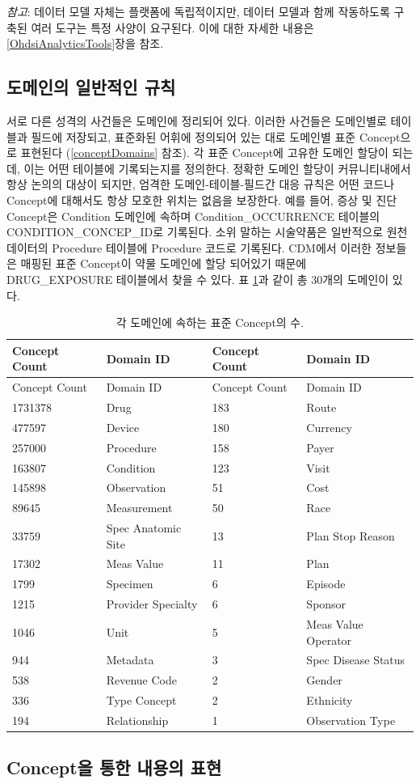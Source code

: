 \documentclass[11pt]{book}
\theoremstyle{definition}
\theoremstyle{definition}
\theoremstyle{definition}
\theoremstyle{remark}
\begin{document}
\emph{참고}: 데이터 모델 자체는 플랫폼에 독립적이지만, 데이터 모델과
함께 작동하도록 구축된 여러 도구는 특정 사양이 요구된다. 이에 대한
자세한 내용은 \ref{OhdsiAnalyticsTools}장을 참조.

\subsection{도메인의 일반적인 규칙}\label{domains}

서로 다른 성격의 사건들은 도메인에 정리되어 있다. 이러한 사건들은
도메인별로 테이블과 필드에 저장되고, 표준화된 어휘에 정의되어 있는 대로
도메인별 표준 Concept으로 표현된다 (\ref{conceptDomains} 참조). 각 표준
Concept에 고유한 도메인 할당이 되는데, 이는 어떤 테이블에 기록되는지를
정의한다. 정확한 도메인 할당이 커뮤니티내에서 항상 논의의 대상이 되지만,
엄격한 도메인-테이블-필드간 대응 규칙은 어떤 코드나 Concept에 대해서도
항상 모호한 위치는 없음을 보장한다. 예를 들어, 증상 및 진단 Concept은
Condition 도메인에 속하며 Condition\_OCCURRENCE
테이블의CONDITION\_CONCEP\_ID로 기록된다. 소위 말하는 시술약품은
일반적으로 원천 데이터의 Procedure 테이블에 Procedure 코드로 기록된다.
CDM에서 이러한 정보들은 매핑된 표준 Concept이 약물 도메인에 할당
되어있기 때문에 DRUG\_EXPOSURE 테이블에서 찾을 수 있다. 표
\ref{tab:domains}과 같이 총 30개의 도메인이 있다.

\begin{longtable}[]{@{}llll@{}}
\caption{\label{tab:domains} 각 도메인에 속하는 표준 Concept의
수.}\tabularnewline
\toprule
Concept Count & Domain ID & Concept Count & Domain ID\tabularnewline
\midrule
\endfirsthead
\toprule
Concept Count & Domain ID & Concept Count & Domain ID\tabularnewline
\midrule
\endhead
1731378 & Drug & 183 & Route\tabularnewline
477597 & Device & 180 & Currency\tabularnewline
257000 & Procedure & 158 & Payer\tabularnewline
163807 & Condition & 123 & Visit\tabularnewline
145898 & Observation & 51 & Cost\tabularnewline
89645 & Measurement & 50 & Race\tabularnewline
33759 & Spec Anatomic Site & 13 & Plan Stop Reason\tabularnewline
17302 & Meas Value & 11 & Plan\tabularnewline
1799 & Specimen & 6 & Episode\tabularnewline
1215 & Provider Specialty & 6 & Sponsor\tabularnewline
1046 & Unit & 5 & Meas Value Operator\tabularnewline
944 & Metadata & 3 & Spec Disease Status\tabularnewline
538 & Revenue Code & 2 & Gender\tabularnewline
336 & Type Concept & 2 & Ethnicity\tabularnewline
194 & Relationship & 1 & Observation Type\tabularnewline
\bottomrule
\end{longtable}

\subsection{Concept을 통한 내용의 표현}\label{concept---}
\end{document}
